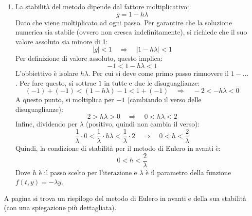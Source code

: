 \begin{enumerate}
\begin{enumerate}
        \item La stabilità del metodo dipende dal fattore moltiplicativo:
        \begin{equation*}
            g = 1 - h\lambda
        \end{equation*}
        Dato che viene moltiplicato ad ogni passo. Per garantire che la soluzione numerica sia stabile (ovvero non cresca indefinitamente), si richiede che il suo valore assoluto sia minore di 1:
        \begin{equation*}
            |g| < 1 \quad \Rightarrow \quad |1 - h\lambda| < 1
        \end{equation*}
        Per definizione di valore assoluto, questo implica:
        \begin{equation*}
            -1 < 1 - h\lambda < 1
        \end{equation*}
        L'obbiettivo è isolare $h \lambda$. Per cui si deve come primo passo rimuovere il $1 - \dots$. Per fare questo, si sottrae $1$ in tutte e due le disuguaglianze:
        \begin{equation*}
            \left(-1\right) + \left(-1\right) < \left(1 - h\lambda\right) - 1 < 1 + \left(- 1\right) \quad \Rightarrow \quad -2 < - h\lambda < 0
        \end{equation*}
        A questo punto, si moltiplica per $-1$ (cambiando il verso delle disuguaglianze):
        \begin{equation*}
            2 > h\lambda > 0 \quad \Rightarrow \quad 0 < h\lambda < 2
        \end{equation*}
        Infine, dividendo per $\lambda$ (positivo, quindi non cambia il verso):
        \begin{equation*}
            \dfrac{1}{\lambda} \cdot 0 < \dfrac{1}{\lambda} \cdot h\lambda < \dfrac{1}{\lambda} \cdot 2 \quad \Rightarrow \quad 0 < h < \dfrac{2}{\lambda}
        \end{equation*}
        Quindi, la condizione di stabilità per il metodo di Eulero in avanti è:
        \begin{equation*}
            0 < h < \dfrac{2}{\lambda}
        \end{equation*}
        Dove $h$ è il passo scelto per l'iterazione e $\lambda$ è il parametro della funzione $f(t, y) = -\lambda y$.
    \end{enumerate}
    A pagina  si trova un riepilogo del metodo di Eulero in avanti e della sua stabilità (con una spiegazione più dettagliata).
\end{enumerate}
